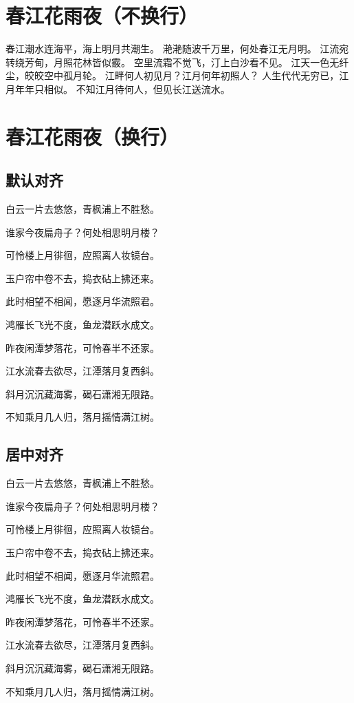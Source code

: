 \documentclass{article}
\begin{document}
\tableofcontents    %


\section{春江花雨夜（不换行）}
春江潮水连海平，海上明月共潮生。
滟滟随波千万里，何处春江无月明。
江流宛转绕芳甸，月照花林皆似霰。
空里流霜不觉飞，汀上白沙看不见。
江天一色无纤尘，皎皎空中孤月轮。
江畔何人初见月？江月何年初照人？
人生代代无穷已，江月年年只相似。
不知江月待何人，但见长江送流水。


\section{春江花雨夜（换行）}

\subsection{默认对齐}

白云一片去悠悠，青枫浦上不胜愁。

谁家今夜扁舟子？何处相思明月楼？

可怜楼上月徘徊，应照离人妆镜台。

玉户帘中卷不去，捣衣砧上拂还来。

此时相望不相闻，愿逐月华流照君。

鸿雁长飞光不度，鱼龙潜跃水成文。

昨夜闲潭梦落花，可怜春半不还家。

江水流春去欲尽，江潭落月复西斜。

斜月沉沉藏海雾，碣石潇湘无限路。

不知乘月几人归，落月摇情满江树。


\subsection{居中对齐}

\begin{center}

白云一片去悠悠，青枫浦上不胜愁。

谁家今夜扁舟子？何处相思明月楼？

可怜楼上月徘徊，应照离人妆镜台。

玉户帘中卷不去，捣衣砧上拂还来。

此时相望不相闻，愿逐月华流照君。

鸿雁长飞光不度，鱼龙潜跃水成文。

昨夜闲潭梦落花，可怜春半不还家。

江水流春去欲尽，江潭落月复西斜。

斜月沉沉藏海雾，碣石潇湘无限路。

不知乘月几人归，落月摇情满江树。
\end{center}
\end{document}

